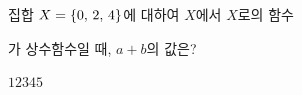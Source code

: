 \hspace*{2mm}\begin{minipage}[t]{\dimexpr\linewidth-2mm\relax}\vspace{0pt}
집합 $X=\{0,\mkern3mu 2,\mkern3mu 4\}$에 대하여 $X$에서 $X$로의 함수\par\smallskip{}\par\smallskip\noindent 가 상수함수일 때, $a+b$의 값은? 
\begin{choices32}{$1$}{$2$}{$3$}{$4$}{$5$}\end{choices32}\end{minipage}
